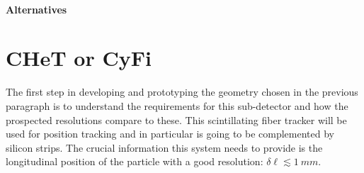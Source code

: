 \begin{refsection}
    \paragraph{Alternatives}

\section{CHeT or CyFi}
    The first step in developing and prototyping the geometry chosen in the previous paragraph is to understand the requirements for this sub-detector and how the prospected resolutions compare to these.
    This scintillating fiber tracker will be used for position tracking and in particular is going to be complemented by silicon strips. The crucial information this system needs to provide is the longitudinal position of the particle with a good resolution: $\delta \ell \lesssim \SI{1}{mm}$.


\end{refsection}
